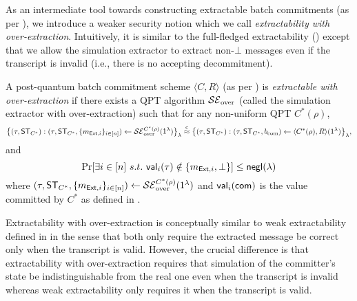 As an intermediate tool towards constructing extractable batch commitments (as per ), we introduce a weaker security notion which we call \emph{extractability with over-extraction}.
Intuitively, it is similar to the full-fledged extractability  () except that we allow the simulation extractor to extract non-$\bot$ messages even if the transcript is invalid (i.e., there is no accepting decommitment). 
\begin{definition}\label{def:sim-ext-bcom:over}
A post-quantum batch commitment scheme $\langle C, R\rangle$ (as per ) is {\em extractable with over-extraction} if there exists a QPT algorithm $\mathcal{SE}_{\mathrm{over}}$ (called the simulation extractor with over-extraction) such that for any non-uniform QPT $C^*(\rho)$, 
\begin{equation*}
\big\{ (\tau,\mathsf{ST}_{C^*}):(\tau,\mathsf{ST}_{C^*},\{m_{\mathsf{Ext},i}\}_{i\in[n]})\gets \mathcal{SE}_{\mathrm{over}}^{C^*(\rho)}(1^\lambda) \big\}_\lambda
\stackrel{\text{c}}{\approx}
\big\{(\tau, \mathsf{ST}_{C^*}):(\tau,\mathsf{ST}_{C^*},b_{\mathrm{com}}) \gets \langle C^*(\rho), R \rangle(1^\lambda)\big\}_\lambda,  
\end{equation*}
and 
\begin{equation*}
    \Pr[\exists i\in[n]~s.t.~\mathsf{val}_i(\tau)\notin\{m_{\mathsf{Ext},i},\bot\}]\le \mathsf{negl}(\lambda)
\end{equation*}
where 
$(\tau,\mathsf{ST}_{C^*},\{m_{\mathsf{Ext},i}\}_{i\in[n]})\gets \mathcal{SE}_{\mathrm{over}}^{C^*(\rho)}(1^\lambda)$ and $\mathsf{val}_i(\mathsf{com})$ is the value committed by $C^*$ as defined in .  
\end{definition}
\begin{remark}
Extractability with over-extraction is conceptually similar to weak extractability defined in \cite{C:CCLY22} in the sense that both only require the extracted message be correct only when the transcript is valid. However, the crucial difference is that extractability with over-extraction requires that simulation of the committer's state be indistinguishable from the real one even when the transcript is invalid whereas weak extractability only requires it when  the transcript is valid.
\end{remark}





